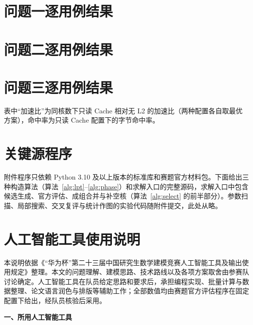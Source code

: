\section{问题一逐用例结果}


\section{问题二逐用例结果}


\section{问题三逐用例结果}
表中“加速比”为同核数下只读 Cache 相对无 L2 的加速比（两种配置各自取最优方案），命中率为只读 Cache 配置下的字节命中率。


\section{关键源程序}

附件程序只依赖 Python 3.10 及以上版本的标准库和赛题官方材料包。下面给出三种构造算法（算法~\ref{alg:lpt}--\ref{alg:phase}）和求解入口的完整源码，求解入口中包含候选生成、官方评估、成组合并与补空核（算法~\ref{alg:select} 的前半部分）。参数扫描、局部搜索、交叉复评与统计作图的实验代码随附件提交，此处从略。






\section{人工智能工具使用说明}

本说明依据《“华为杯”第二十三届中国研究生数学建模竞赛人工智能工具及输出使用规定》整理。本文的问题理解、建模思路、技术路线以及各项方案取舍由参赛队讨论确定。人工智能工具在队员给定思路和要求后，承担编程实现、批量计算与数据整理、论文语言润色与排版等辅助工作；全部数值均由赛题官方评估程序在固定配置下给出，经队员核验后采用。

\noindent\textbf{一、所用人工智能工具}
\begin{center}\small
{}
\end{center}

